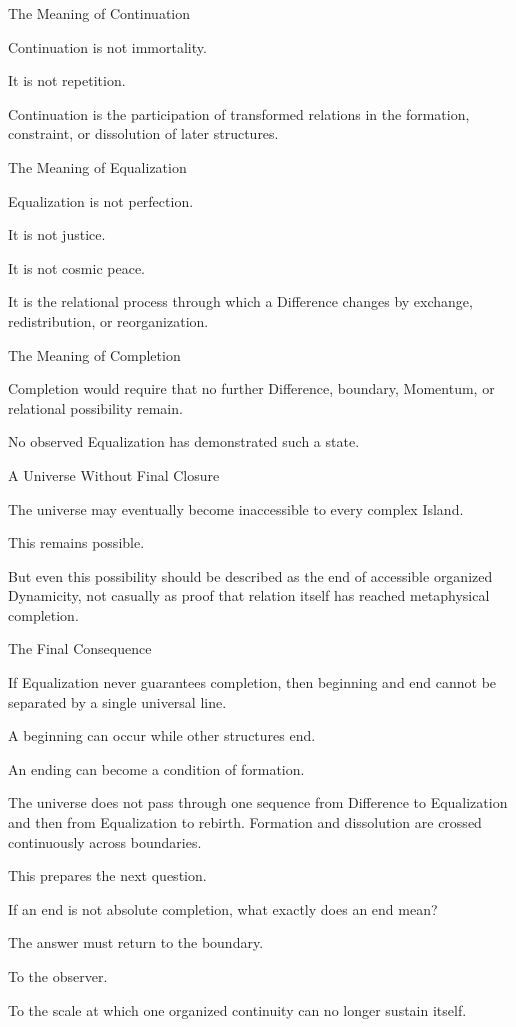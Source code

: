 The Meaning of Continuation

Continuation is not immortality.

It is not repetition.

Continuation is the participation of transformed relations in the formation, constraint, or dissolution of later structures.

The Meaning of Equalization

Equalization is not perfection.

It is not justice.

It is not cosmic peace.

It is the relational process through which a Difference changes by exchange, redistribution, or reorganization.

The Meaning of Completion

Completion would require that no further Difference, boundary, Momentum, or relational possibility remain.

No observed Equalization has demonstrated such a state.

A Universe Without Final Closure

The universe may eventually become inaccessible to every complex Island.

This remains possible.

But even this possibility should be described as the end of accessible organized Dynamicity, not casually as proof that relation itself has reached metaphysical completion.

The Final Consequence

If Equalization never guarantees completion, then beginning and end cannot be separated by a single universal line.

A beginning can occur while other structures end.

An ending can become a condition of formation.

The universe does not pass through one sequence from Difference to Equalization and then from Equalization to rebirth. Formation and dissolution are crossed continuously across boundaries.

This prepares the next question.

If an end is not absolute completion, what exactly does an end mean?

The answer must return to the boundary.

To the observer.

To the scale at which one organized continuity can no longer sustain itself.

